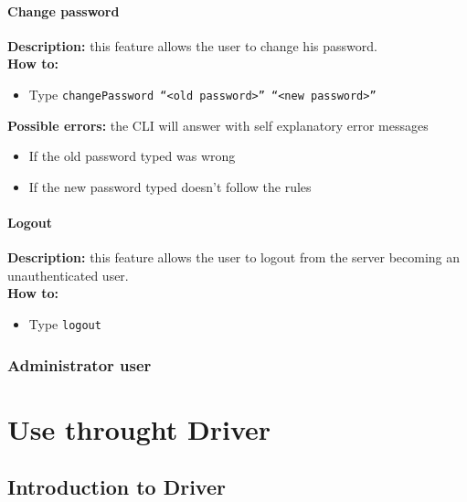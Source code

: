 \documentclass{scalatekids-article}
\begin{document}
\paragraph{Change password}
\label{sec:changepassword}
\textbf{Description:} this feature allows the user to change his password.\\
\textbf{How to:} 
\begin{itemize}
	\item Type \texttt{changePassword ``<old password>'' ``<new password>''}
\end{itemize}
\textbf{Possible errors:} the CLI will answer with self explanatory error messages 
\begin{itemize}
	\item If the old password typed was wrong
	\item If the new password typed doesn't follow the rules %
\end{itemize}

\paragraph{Logout}
\label{sec:removeitem}
\textbf{Description:} this feature allows the user to logout from the server becoming an unauthenticated user.\\
\textbf{How to:} 
\begin{itemize}
	\item Type \texttt{logout}
\end{itemize}


\subsubsection{Administrator user}
\label{sec:administratoruser}

\section{Use throught Driver}

\subsection{Introduction to Driver}

\listoftables

\listoffigures
\end{document}
